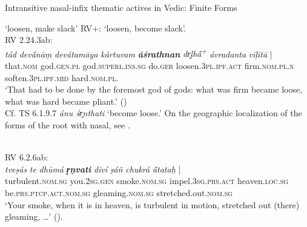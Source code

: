\documentclass[output=paper,colorlinks,citecolor=brown]{langscibook}
\begin{document}
\begin{exe}
    \ex Intransitive nasal-infix thematic actives in Vedic: Finite Forms
    \begin{xlist}
\ex  {} ‘loosen, make slack’ RV+:  ‘loosen, become slack'.\\

RV 2.24.3ab:\\ \gll
 \textit{tád} \textit{dev{ā́}nāṃ} \textit{devátamāya} \textit{kártuvam} {\textbf{\textit{áśrathnan}} } \textit{dr̥ḷh{ā́}\textsuperscript{+}} \textit{ávradanta} {\textit{vīḷitā} |} \\
 that.\textsc{nom} god.\textsc{gen.pl} god.\textsc{superl.ins.sg} do.\textsc{ger} loosen.\textsc{3pl.ipf.act} firm.\textsc{nom.pl.n} soften.\textsc{3pl.ipf.mid} hard.\textsc{nom.pl.}\\
 \glt `That had to be done by the foremost god of gods: what was firm became loose, what was hard became pliant.' (\citealt{JamisonBrereton2014})\\

 \vspace{0.3cm} 
 Cf. TS 6.1.9.7 \textit{ánu śr̥nthati} ‘become loose.’ On the geographic localization of the forms of the root with nasal, see \citealt[95\textsuperscript{3}]{Insler1991}.

\\

\vspace{0.3cm}
RV 6.2.6ab:\\ 
\gll \textit{tveṣás} \textit{te} \textit{dhūmá} {\textbf{\textit{r̥ṇvati}} } \textit{diví} \textit{ṣáñ} \textit{chukrá}  {\textit{{ā́}tataḥ} |}\\
turbulent.\textsc{nom.sg} you.\textsc{2sg.gen} smoke.\textsc{nom.sg} impel.\textsc{3sg.prs.act} heaven.\textsc{loc.sg} be.\textsc{prs.ptcp.act.nom.sg} gleaming.\textsc{nom.sg} stretched.out.\textsc{nom.sg}\\
\glt `Your smoke, when it is in heaven, is turbulent in motion, stretched out (there) gleaming, …' (\citealt{JamisonBrereton2014}).\\


\end{xlist}
\end{exe}
\end{document}

